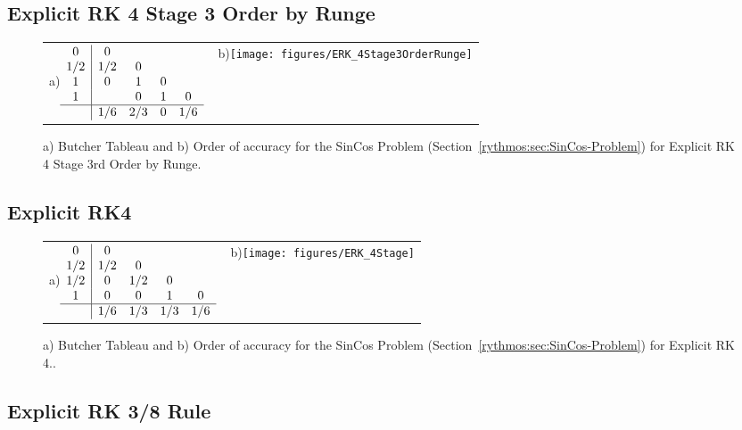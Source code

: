 \subsection{Explicit RK 4 Stage 3 Order by Runge}

\begin{figure}[H]
\centering{}%
\begin{tabular}{cc}
a)$\begin{array}{c|cccc}
0 & 0\\
1/2 & 1/2 & 0\\
1 & 0 & 1 & 0\\
1 &  & 0 & 1 & 0\\
\hline  & 1/6 & 2/3 & 0 & 1/6
\end{array}$ & b)\texttt{[image: figures/ERK\_4Stage3OrderRunge]}\tabularnewline
\end{tabular}\caption{a) Butcher Tableau and b) Order of accuracy for the SinCos Problem
(Section~\ref{rythmos:sec:SinCos-Problem}) for Explicit RK 4 Stage
3rd Order by Runge.\label{rythmos:tab:ButcherTableau-ERK_4Stage3OrderRunge}}
\end{figure}


\subsection{Explicit RK4}

\begin{figure}[H]
\centering{}%
\begin{tabular}{cc}
a)$\begin{array}{c|cccc}
0 & 0\\
1/2 & 1/2 & 0\\
1/2 & 0 & 1/2 & 0\\
1 & 0 & 0 & 1 & 0\\
\hline  & 1/6 & 1/3 & 1/3 & 1/6
\end{array}$ & b)\texttt{[image: figures/ERK\_4Stage]}\tabularnewline
\end{tabular}\caption{a) Butcher Tableau and b) Order of accuracy for the SinCos Problem
(Section~\ref{rythmos:sec:SinCos-Problem}) for Explicit RK 4.\label{rythmos:tab:ButcherTableau-ERK_4Stage}.}
\end{figure}


\subsection{Explicit RK 3/8 Rule}

